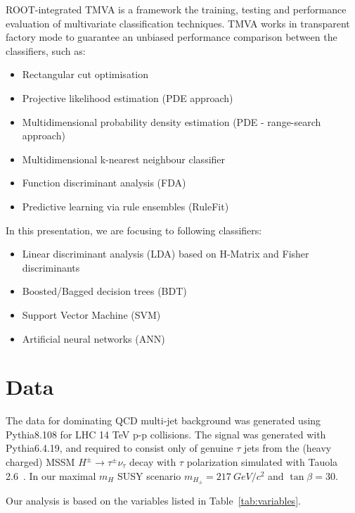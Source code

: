 \documentclass[a4paper]{jpconf}
\begin{document}
ROOT-integrated TMVA is a framework the training, testing and performance evaluation
of multivariate classification techniques.
TMVA works in transparent factory mode 
to guarantee an unbiased performance comparison between the classifiers, such as:

\begin{itemize}
\item Rectangular cut optimisation
\item Projective likelihood estimation (PDE approach)
\item Multidimensional probability density estimation (PDE - range-search approach)
\item Multidimensional k-nearest neighbour classifier

\item Function discriminant analysis (FDA)
\item Predictive learning via rule ensembles (RuleFit)
\end{itemize}
 

\vspace{0.5cm}
In this presentation, we are focusing to following classifiers:
\begin{itemize}
\item Linear discriminant analysis (LDA) based on H-Matrix and Fisher discriminants
\item Boosted/Bagged decision trees (BDT)
\item Support Vector Machine (SVM) 
\item Artificial neural networks (ANN)
\end{itemize}


\section{Data}

The data for  dominating QCD multi-jet background was generated using Pythia8.108 for LHC 14 TeV p-p collisions.
The signal  was generated with Pythia6.4.19,
and required to consist only of genuine $\tau$ jets from the 
(heavy charged) MSSM $H^{\pm} \rightarrow \tau^{\pm}\nu_{\tau}$ decay 
with $\tau$ polarization simulated with Tauola 2.6~\cite{taola}.
In our maximal $m_H$ SUSY 
scenario \cite{maxsusy}  $m_{H_{\pm}}=217~GeV/c^2$ and $\tan\beta = 30$.

Our analysis is based on the variables listed in Table~\ref{tab:variables}.

\end{document}
